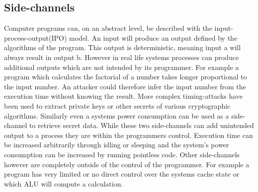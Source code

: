\documentclass[conference,compsoc,final,a4paper]{IEEEtran}
\begin{document}
\subsection{Side-channels}
Computer programs can, on an abstract level, be described with the input-process-output(IPO) model. An input will produce an output defined by the algorithms
of the program. This output is deterministic, meaning input a will always result in output b. However in real life systems processes can produce additional outputs
which are not intended by its programmer. For example a program which calculates the factorial of a number takes longer proportional to the input number.
An attacker could therefore infer the input number from the execution time without knowing the result. More complex timing-attacks have been used to
extract private keys or other secrets of various cryptographic algorithms. \cite{bernstein2005cache}\cite{kocher1996timing}
Similarly even a systems power consumption can be used as a side-channel to retrieve secret data. \cite{kocher1999differential}
While these two side-channels can add unintended output to a process they are within the programmers control. Execution time can be increased arbitrarily through
idling or sleeping and the system's power consumption can be increased by running pointless code. Other side-channels however are completely outside of the
control of the programmer. For example a program has very limited or no direct control over the systems cache state or which ALU will compute a calculation.
\end{document}
